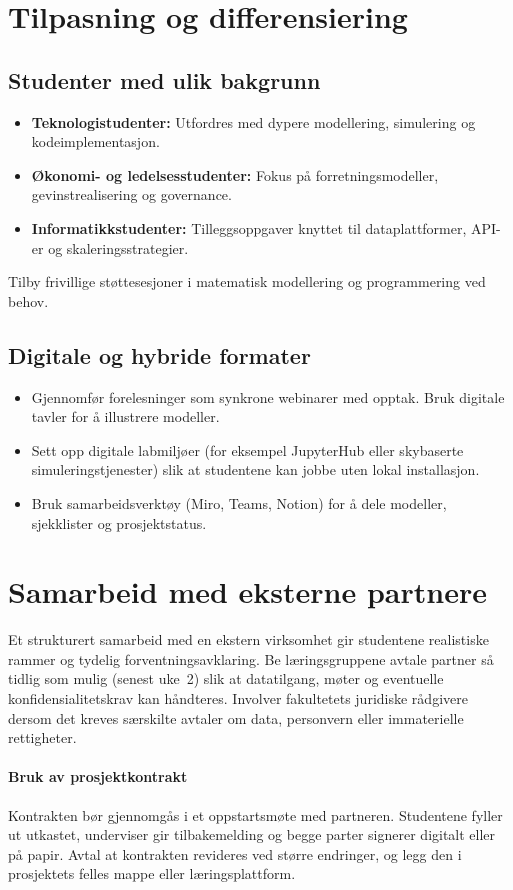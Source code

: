 \section{Tilpasning og differensiering}
\subsection{Studenter med ulik bakgrunn}
\begin{itemize}
    \item \textbf{Teknologistudenter:} Utfordres med dypere modellering, simulering og kodeimplementasjon.
    \item \textbf{Økonomi- og ledelsesstudenter:} Fokus på forretningsmodeller, gevinstrealisering og governance.
    \item \textbf{Informatikkstudenter:} Tilleggsoppgaver knyttet til dataplattformer, API-er og skaleringsstrategier.
\end{itemize}
Tilby frivillige støttesesjoner i matematisk modellering og programmering ved behov.

\subsection{Digitale og hybride formater}
\begin{itemize}
    \item Gjennomfør forelesninger som synkrone webinarer med opptak. Bruk digitale tavler for å illustrere modeller.
    \item Sett opp digitale labmiljøer (for eksempel JupyterHub eller skybaserte simuleringstjenester) slik at studentene kan jobbe uten lokal installasjon.
    \item Bruk samarbeidsverktøy (Miro, Teams, Notion) for å dele modeller, sjekklister og prosjektstatus.
\end{itemize}

\section{Samarbeid med eksterne partnere}
Et strukturert samarbeid med en ekstern virksomhet gir studentene realistiske rammer og tydelig forventningsavklaring. Be læringsgruppene avtale partner så tidlig som mulig (senest uke~2) slik at datatilgang, møter og eventuelle konfidensialitetskrav kan håndteres. Involver fakultetets juridiske rådgivere dersom det kreves særskilte avtaler om data, personvern eller immaterielle rettigheter.

\paragraph{Bruk av prosjektkontrakt}
Kontrakten bør gjennomgås i et oppstartsmøte med partneren. Studentene fyller ut utkastet, underviser gir tilbakemelding og begge parter signerer digitalt eller på papir. Avtal at kontrakten revideres ved større endringer, og legg den i prosjektets felles mappe eller læringsplattform.

